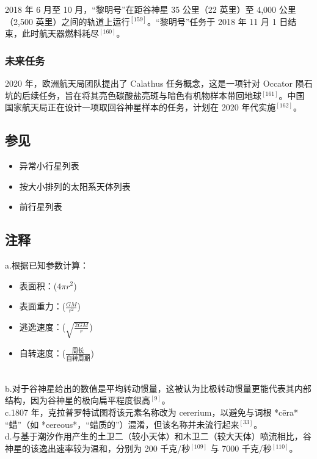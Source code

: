 2018 年 6 月至 10 月，“黎明号”在距谷神星 35 公里（22 英里）至 4,000 公里（2,500 英里）之间的轨道上运行$^{[159]}$。“黎明号”任务于 2018 年 11 月 1 日结束，此时航天器燃料耗尽$^{[160]}$。
\subsubsection{未来任务}
2020 年，欧洲航天局团队提出了 Calathus 任务概念，这是一项针对 Occator 陨石坑的后续任务，旨在将其亮色碳酸盐亮斑与暗色有机物样本带回地球$^{[161]}$。中国国家航天局正在设计一项取回谷神星样本的任务，计划在 2020 年代实施$^{[162]}$。
\subsection{参见}
\begin{itemize}
\item 异常小行星列表
\item 按大小排列的太阳系天体列表
\item 前行星列表
\end{itemize}
\subsection{注释}
a.根据已知参数计算：
\begin{itemize}
\item 表面积：($4\pi r^{2}$)
\item 表面重力：($\frac{GM}{r^{2}}$)
\item 逃逸速度：($\sqrt{\frac{2GM}{r}}$)
\item 自转速度：($\frac{\text{周长}}{\text{自转周期}}$)
\end{itemize}\\
b.对于谷神星给出的数值是平均转动惯量，这被认为比极转动惯量更能代表其内部结构，因为谷神星的极向扁平程度很高$^{[9]}$。\\
c.1807 年，克拉普罗特试图将该元素名称改为 cererium，以避免与词根 *cēra* “蜡”（如 *cereous*，“蜡质的”）混淆，但该名称并未流行起来$^{[33]}$。\\
d.与基于潮汐作用产生的土卫二（较小天体）和木卫二（较大天体）喷流相比，谷神星的该逸出速率较为温和，分别为 200 千克/秒$^{[109]}$ 与 7000 千克/秒$^{[110]}$。
